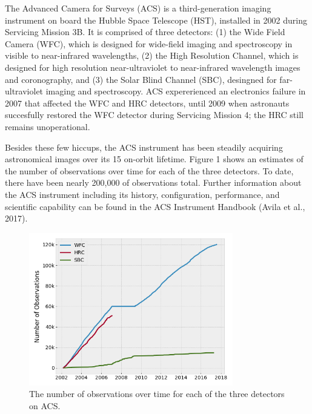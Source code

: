 \documentclass[10pt,journal,compsoc]{IEEEtran}
\begin{document}
The Advanced Camera for Surveys (ACS) is a third-generation imaging
instrument on board the Hubble Space Telescope (HST), installed in 2002 during
Servicing Mission 3B. It is comprised of three detectors: (1) the Wide Field Camera
(WFC), which is designed for wide-field imaging and spectroscopy in visible to
near-infrared wavelengths, (2) the High Resolution Channel, which is designed for
high resolution near-ultraviolet to near-infrared wavelength images and coronography,
and (3) the Solar Blind Channel (SBC), desingned for far-ultraviolet imaging and
spectroscopy.  ACS expererienced an electronics failure in 2007 that affected
the WFC and HRC detectors, until 2009 when astronauts succesfully restored the WFC
detector during Servicing Mission 4; the HRC still remains unoperational.

Besides these few hiccups, the ACS instrument has been steadily acquiring astronomical
images over its 15 on-orbit lifetime.  Figure 1 shows an estimates of the number of
observations over time for each of the three detectors.  To date, there have been
nearly 200,000 of observations total.  Further information about the ACS instrument
including its history, configuration, performance, and scientific capability can be
found in the ACS Instrument Handbook (Avila et al., 2017).

\begin{figure}[!t]
\centering
\includegraphics[width=3.5in]{./figures/num_obs.png}
\caption{The number of observations over time for each of the three detectors on ACS.}
\label{fig1}
\end{figure}
\end{document}

